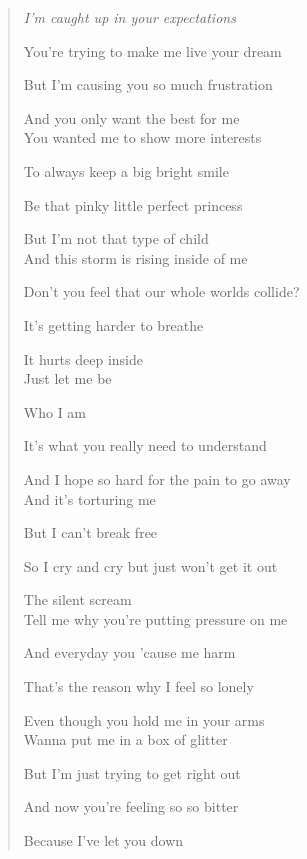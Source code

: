 \documentclass{book}
\numberwithin{equation}{section}
\begin{document}
\begin{quotation}\it
    I'm caught up in your expectations
    
    You're trying to make me live your dream
    
    But I'm causing you so much frustration
    
    And you only want the best for me
    \\
    
    You wanted me to show more interests
    
    To always keep a big bright smile
    
    Be that pinky little perfect princess
    
    But I'm not that type of child
    \\
    
    And this storm is rising inside of me
    
    Don't you feel that our whole worlds collide?
    
    It's getting harder to breathe
    
    It hurts deep inside
    \\
    
    Just let me be
    
    Who I am
    
    It's what you really need to understand
    
    And I hope so hard for the pain to go away
    \\
    
    And it's torturing me
    
    But I can't break free
    
    So I cry and cry but just won't get it out
    
    The silent scream
    \\
    
    Tell me why you're putting pressure on me
    
    And everyday you 'cause me harm
    
    That's the reason why I feel so lonely
    
    Even though you hold me in your arms
    \\
    
    Wanna put me in a box of glitter
    
    But I'm just trying to get right out
    
    And now you're feeling so so bitter
    
    Because I've let you down
    \\
    

\end{quotation}
\end{document}
